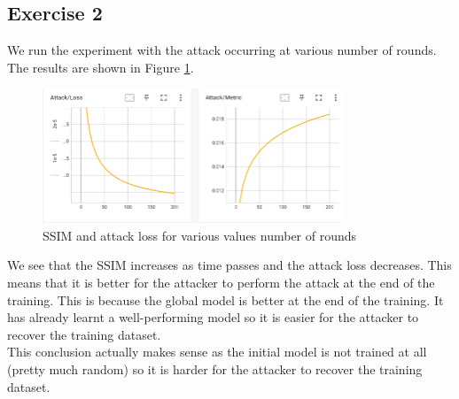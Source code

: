 \documentclass[12pt]{article}
\begin{document}
\subsection{Exercise 2}
We run the experiment with the attack occurring at various number of rounds. The results are shown in Figure \ref{fig:SSIM}.
\begin{figure}[h]
  \centering
  \includegraphics[width=0.8\textwidth]{./images/ssim_200.png}
  \caption{SSIM and attack loss for various values number of rounds}
  \label{fig:SSIM}
\end{figure}
We see that the SSIM increases as time passes and the attack loss decreases. This means that it is better for the attacker to perform the attack at the end of the training. This is because the global model is better at the end of the training. It has already learnt a well-performing model so it is easier for the attacker to recover the training dataset. \\
This conclusion actually makes sense as the initial model is not trained at all (pretty much random) so it is harder for the attacker to recover the training dataset.

\end{document}
